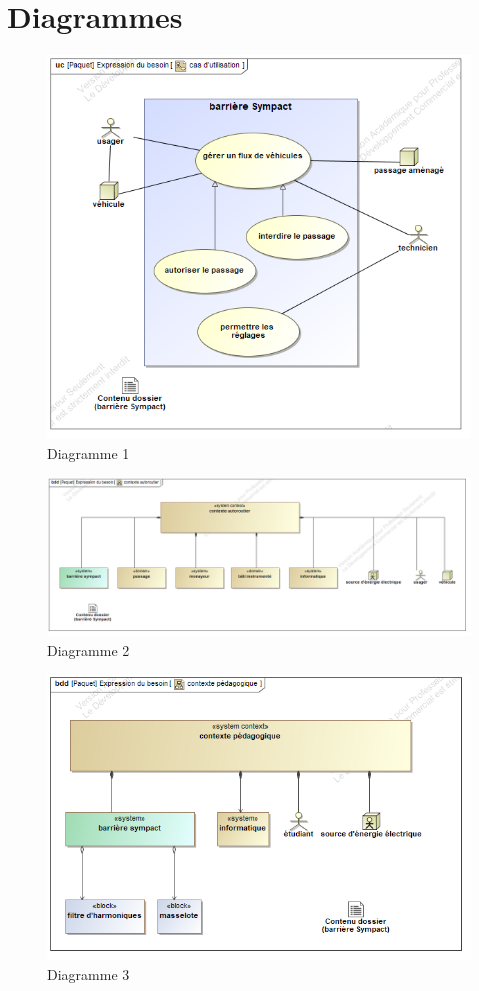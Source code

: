 \newpage

\section{Diagrammes}

\begin{figure}[ht!]
\begin{center}
 \includegraphics[width=0.5\linewidth]{img/diagram1}
\end{center}
\caption{\label{figure1} Diagramme 1}
\end{figure}

\begin{figure}[ht!]
\begin{center}
 \includegraphics[width=\linewidth]{img/diagram2}
\end{center}
\caption{\label{figure2} Diagramme 2}
\end{figure}

\newpage

\begin{figure}[ht!]
\begin{center}
 \includegraphics[width=0.7\linewidth]{img/diagram3}
\end{center}
\caption{\label{figure3} Diagramme 3}
\end{figure}

